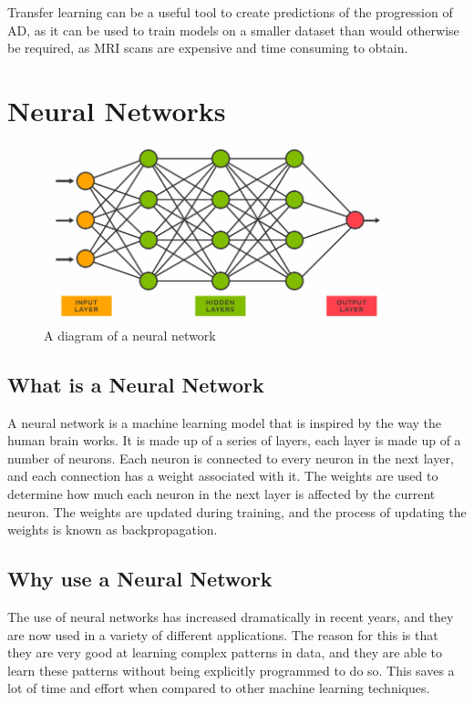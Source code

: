 \documentclass[]{final_report}
\begin{document}
Transfer learning can be a useful tool to create predictions of the progression of AD, as it can be used to train models on a smaller dataset than would otherwise be required, as MRI scans are expensive and time consuming to obtain.

\chapter{Neural Networks}
\begin{figure}[ht!]
  \centering
  \includegraphics[width=100mm]{images/NeuralNetwork.png}
  \caption{A diagram of a neural network \cite{NeuralNetworkDiagram}}
\end{figure}

\section{What is a Neural Network}
A neural network is a machine learning model that is inspired by the way the human brain works.
It is made up of a series of layers, each layer is made up of a number of neurons.
Each neuron is connected to every neuron in the next layer, and each connection has a weight associated with it.
The weights are used to determine how much each neuron in the next layer is affected by the current neuron.
The weights are updated during training, and the process of updating the weights is known as backpropagation.

\section{Why use a Neural Network}
The use of neural networks has increased dramatically in recent years, and they are now used in a variety of different applications.
The reason for this is that they are very good at learning complex patterns in data, and they are able to learn
these patterns without being explicitly programmed to do so. This saves a lot of time and effort when compared to other machine learning techniques.
\end{document}
